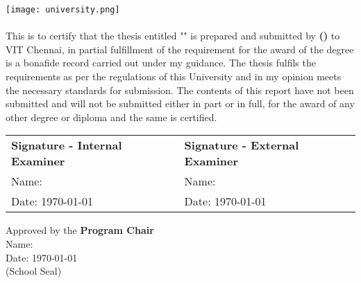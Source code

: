 \vspace*{3.0in}
\clearpage

\begin{center}
    \vspace*{0.6in}
    \texttt{[image: university.png]}\\
    \vspace{0.6in}
    \vspace{0.3in}
\end{center}

\paragraph{}
This is to certify that the thesis entitled "\projecttitle" is prepared and submitted by \textbf{\authorname \hspace{0.01cm} (\regnum)} to VIT Chennai,
in partial fulfillment of the requirement for the award of the degree \textbf{\degreename} is a bonafide record carried out under my guidance.
The thesis fulfils the requirements as per the regulations of this University and in my opinion meets the necessary standards for submission.
The contents of this report have not been submitted and will not be submitted either in part or in full, for the award of any other degree or
diploma and the same is certified.

\vspace{0.6in}
\begin{table}[h]
    \begin{tabular}{ll}
        \textbf{Signature - Internal Examiner} & \textbf{Signature - External Examiner} \\
        Name:                                  & Name:                                  \\
        Date: \today                           & Date: \today                           \\
    \end{tabular}
\end{table}

\vspace*{0.3in}
\begin{flushleft}
    Approved by the \textbf{Program Chair \degreename} \\
    Name:                                              \\
    Date: \today                                       \\
    \vspace{0.1in}
    (School Seal)                                      \\
\end{flushleft}

